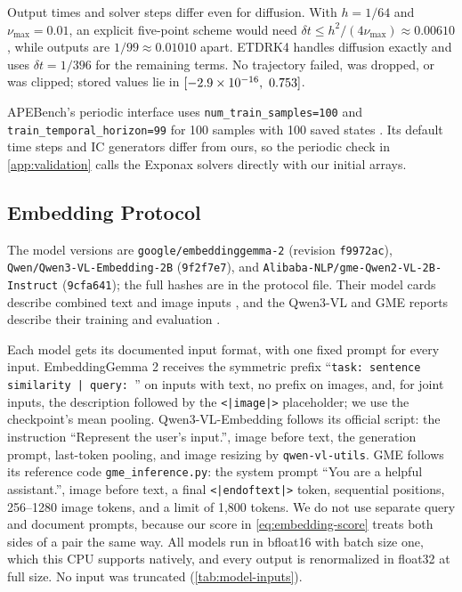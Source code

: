 Output times and solver steps differ even for diffusion. With $h=1/64$ and $\nu_{\max}=0.01$, an explicit five-point scheme would need $\delta t\le h^2/(4\nu_{\max})\approx0.00610$, while outputs are $1/99\approx0.01010$ apart. ETDRK4 handles diffusion exactly and uses $\delta t=1/396$ for the remaining terms. No trajectory failed, was dropped, or was clipped; stored values lie in $[\simMin,\ \simMax]$.

APEBench's periodic interface uses \texttt{num\_train\_samples=100} and \texttt{train\_temporal\_horizon=99} for 100 samples with 100 saved states \citep{apebench_base_docs}. Its default time steps and IC generators differ from ours, so the periodic check in \cref{app:validation} calls the Exponax solvers directly with our initial arrays.

\subsection{Embedding Protocol}
\label{app:embedding-protocol}
The model versions are \texttt{google/embeddinggemma-2} (revision \texttt{f9972ac}), \texttt{Qwen/Qwen3-VL-Embedding-2B} (\texttt{9f2f7e7}), and \texttt{Alibaba-NLP/gme-Qwen2-VL-2B-Instruct} (\texttt{9cfa641}); the full hashes are in the protocol file. Their model cards describe combined text and image inputs \citep{embeddinggemma2_modelcard,qwen3vl_embedding_modelcard,gme_modelcard}, and the Qwen3-VL and GME reports describe their training and evaluation \citep{li2026qwen3vl,zhang2024gme}.

Each model gets its documented input format, with one fixed prompt for every input. EmbeddingGemma 2 receives the symmetric prefix ``\texttt{task: sentence similarity | query: }'' on inputs with text, no prefix on images, and, for joint inputs, the description followed by the \texttt{<|image|>} placeholder; we use the checkpoint's mean pooling. Qwen3-VL-Embedding follows its official script: the instruction ``Represent the user's input.'', image before text, the generation prompt, last-token pooling, and image resizing by \texttt{qwen-vl-utils}. GME follows its reference code \texttt{gme\_inference.py}: the system prompt ``You are a helpful assistant.'', image before text, a final \texttt{<|endoftext|>} token, sequential positions, 256--1280 image tokens, and a limit of 1,800 tokens. We do not use separate query and document prompts, because our score in \cref{eq:embedding-score} treats both sides of a pair the same way. All models run in bfloat16 with batch size one, which this CPU supports natively, and every output is renormalized in float32 at full size. No input was truncated (\cref{tab:model-inputs}).

